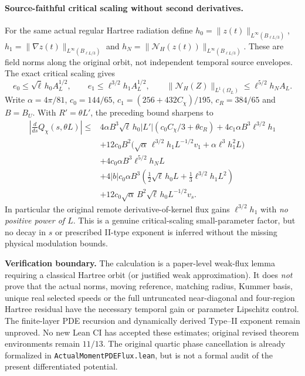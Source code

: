 \paragraph{Source-faithful critical scaling without second derivatives.}
For the same actual regular Hartree radiation define
$h_0=\|z(t)\|_{L^\infty(B_{\ell L/3})}$,
$h_1=\|\nabla z(t)\|_{L^\infty(B_{\ell L/3})}$ and
$h_N=\|\mathcal N_H(z(t))\|_{L^\infty(B_{\ell L/3})}$.
These are field norms along the original orbit, not independent
temporal source envelopes. The exact critical scaling gives
\[
 e_0\le\sqrt\ell\,h_0A_L^{1/2},\qquad
 e_1\le\ell^{3/2}h_1A_L^{1/2},\qquad
 \|\mathcal N_H(Z)\|_{L^1(\Omega_L)}
 \le\ell^{5/2}h_NA_L .
\]
Write $\alpha=4\pi/81$, $c_0=144/65$,
$c_1=(256+432C_\chi)/195$, $c_R=384/65$ and
$B=B_U$. With $R'=\theta L'$, the preceding bound sharpens to
\begin{align*}
\left|\frac d{ds}Q_\chi(s,\theta L)\right|
\le{}&
 4\alpha B^3\sqrt\ell\,h_0|L'|
  (c_0C_\chi/3+\theta c_R)
 +4c_1\alpha B^3\ell^{3/2}h_1\\
&+12c_0B^2\bigl(
 \sqrt\alpha\,\ell^{3/2}h_1L^{-1/2}v_1
 +\alpha\ell^3h_1^2L\bigr)\\
&+4c_0\alpha B^3\ell^{5/2}h_NL\\
&+4|b|c_0\alpha B^3
 \left(\tfrac12\sqrt\ell\,h_0L+
       \tfrac13\ell^{3/2}h_1L^2\right)\\
&+12c_0\sqrt\alpha\,B^2\sqrt\ell\,h_0L^{-1/2}v_s .
\end{align*}
In particular the original remote derivative-of-kernel
flux gains $\ell^{3/2}h_1$ with \emph{no positive power of $L$}.
This is a genuine critical-scaling small-parameter factor, but
no decay in $s$ or prescribed II-type exponent is inferred
without the missing physical modulation bounds.

\medskip
\noindent
\textbf{Verification boundary.}
The calculation is a paper-level weak-flux lemma requiring
a classical Hartree orbit (or justified weak approximation).
It does \emph{not} prove that the actual norms, moving reference,
matching radius, Kummer basis, unique real selected speeds or
the full untruncated near-diagonal and four-region Hartree
residual have the necessary temporal gain or parameter Lipschitz
control. The finite-layer PDE recursion and dynamically derived
Type--II exponent remain unproved. No new Lean CI has accepted
these estimates; original revised theorem environments remain
$11/13$. The original quartic phase cancellation is already
formalized in \texttt{ActualMomentPDEFlux.lean}, but is not a
formal audit of the present differentiated potential.

